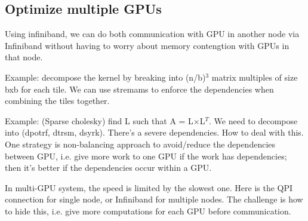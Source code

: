 \subsection{Optimize multiple GPUs}

Using infiniband, we can do both communication with GPU in another node via
Infiniband without having to worry about memory contengtion with GPUs in that node.

Example: decompose the kernel by breaking into (n/b)$^3$ matrix multiples of
size bxb for each tile. We can use stremams to enforce the dependencies when
combining the tiles together.


Example: (Sparse cholesky) find L such that A = L$\times$L$^T$. We need to
decompose into (dpotrf, dtrsm, dsyrk). There's a severe dependencies. How to
deal with this. One strategy is non-balancing approach to avoid/reduce the
dependencies between GPU, i.e. give more work to one GPU if the work has
dependencies; then it's better if the dependencies occur within a GPU. 


In multi-GPU system, the speed is limited by the slowest one. Here is the QPI
connection for single node, or Infiniband for multiple nodes. The challenge is
how to hide this, i.e. give more computations for each GPU before communication. 


